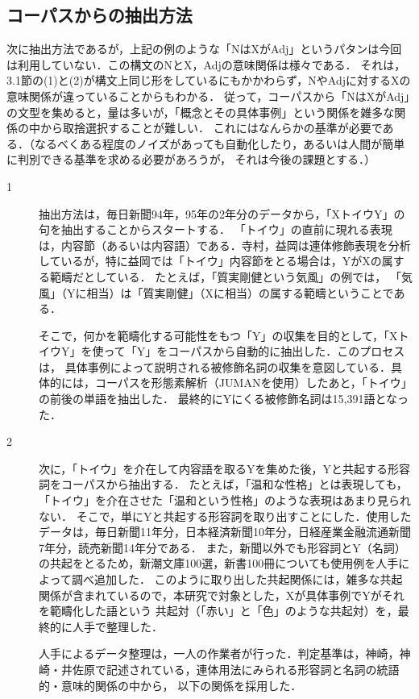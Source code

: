 \documentclass[japanese]{jnlp_1.4}
\begin{document}
\subsection{コーパスからの抽出方法}

次に抽出方法であるが，上記の例のような「NはXがAdj」というパタンは今回は利用していない．この構文のNとX，Adjの意味関係は様々である．
それは，3.1節の(1)と(2)が構文上同じ形をしているにもかかわらず，NやAdjに対するXの意味関係が違っていることからもわかる．
従って，コーパスから「NはXがAdj」の文型を集めると，量は多いが，「概念とその具体事例」という関係を雑多な関係の中から取捨選択することが難しい．
これにはなんらかの基準が必要である．（なるべくある程度のノイズがあっても自動化したり，あるいは人間が簡単に判別できる基準を求める必要があろうが，
それは今後の課題とする．）

\begin{description}
\item[1]
抽出方法は，毎日新聞94年，95年の2年分のデータから，「XトイウY」の句を抽出することからスタートする．
「トイウ」の直前に現れる表現は，内容節（あるいは内容語）である．寺村，益岡は連体修飾表現を分析しているが，特に益岡では「トイウ」内容節をとる場合は，YがXの属する範疇だとしている\cite{Book_35,Book_19}．
たとえば，「質実剛健という気風」の例では，
「気風」（Yに相当）は「質実剛健」（Xに相当）の属する範疇ということである．

そこで，何かを範疇化する可能性をもつ「Y」の収集を目的として，「XトイウY」を使って「Y」をコーパスから自動的に抽出した．このプロセスは，
具体事例によって説明される被修飾名詞の収集を意図している．具体的には，コーパスを形態素解析（JUMANを使用）したあと，「トイウ」の前後の単語を抽出した．
最終的にYにくる被修飾名詞は15,391語となった．

\item[2]
次に，「トイウ」を介在して内容語を取るYを集めた後，Yと共起する形容詞をコーパスから抽出する．
たとえば，「温和な性格」とは表現しても，「トイウ」を介在させた「温和という性格」のような表現はあまり見られない．
そこで，単にYと共起する形容詞を取り出すことにした．使用したデータは，毎日新聞11年分，日本経済新聞10年分，日経産業金融流通新聞7年分，読売新聞14年分である．
また，新聞以外でも形容詞とY（名詞）の共起をとるため，新潮文庫100選，新書100冊についても使用例を人手によって調べ追加した．
このように取り出した共起関係には，雑多な共起関係が含まれているので，本研究で対象とした，Xが具体事例でYがそれを範疇化した語という
共起対（「赤い」と「色」のような共起対）を，最終的に人手で整理した．

人手によるデータ整理は，一人の作業者が行った．判定基準は，神崎，神崎・井佐原で記述されている，連体用法にみられる形容詞と名詞の統語的・意味的関係の中から，
以下の関係を採用した\cite{Article_12,Article_13}．
\end{description} 
\end{document}
